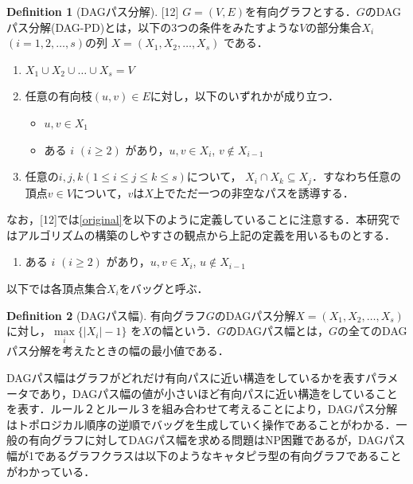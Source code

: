 \documentclass[master]{kuisthesis}		%
\theoremstyle{plain}
\theoremstyle{definition}
\newtheorem{definition*}{Definition}
\begin{document}
\begin{definition*}[DAGパス分解][12]
    $G=(V, E)$を有向グラフとする．$G$のDAGパス分解(DAG-PD)とは，以下の3つの条件をみたすような$V$の部分集合$X_i$ $(i = 1, 2,  \dots, s)$の列 $X=(X_1, X_2,  \dots, X_s)$ である．
    
    \begin{enumerate}
        \item $ X_1 \cup X_2 \cup \dots \cup X_s = V $ 
        \item 任意の有向枝$(u, v) \in E$に対し，以下のいずれかが成り立つ．
        \begin{itemize}
            \item $u, v \in X_1$
            \item ある $i$ $(i \geq 2)$ があり，$u, v \in X_i$, $v \notin X_{i-1}$ \label{original}
        \end{itemize}
        \item 任意の$ i, j, k (1 \leq i \leq j \leq k \leq s)$について， $X_i \cap X_k \subseteq X_j$．すなわち任意の頂点$v \in V$について，$v$は$X$上でただ一つの非空なパスを誘導する．
    \end{enumerate}
    
\end{definition*}

なお，[12]では\ref{original}を以下のように定義していることに注意する．本研究ではアルゴリズムの構築のしやすさの観点から上記の定義を用いるものとする．
\begin{enumerate}
    \item ある $i$ $(i \geq 2)$ があり，$u, v \in X_i$, $u \notin X_{i-1}$ \label{original}
\end{enumerate}

以下では各頂点集合$X_i$をバッグと呼ぶ．

\begin{definition*}[DAGパス幅]
    有向グラフ$G$のDAGパス分解$X=(X_1, X_2,   \dots, X_s)$に対し，$ \underset{i}{\max} \{ |X_i|-1 \}$ を$X$の幅という．$G$のDAGパス幅とは，$G$の全てのDAGパス分解を考えたときの幅の最小値である．
\end{definition*}

DAGパス幅はグラフがどれだけ有向パスに近い構造をしているかを表すパラメータであり，DAGパス幅の値が小さいほど有向パスに近い構造をしていることを表す．ルール２とルール３を組み合わせて考えることにより，DAGパス分解はトポロジカル順序の逆順でバッグを生成していく操作であることがわかる．一般の有向グラフに対してDAGパス幅を求める問題はNP困難であるが，DAGパス幅が1であるグラフクラスは以下のようなキャタピラ型の有向グラフであることがわかっている．
\end{document}
